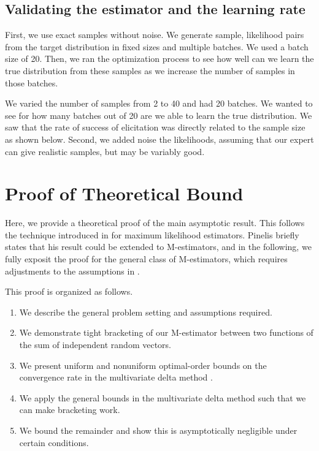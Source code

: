 \subsection{Validating the estimator and the learning rate}

First, we use exact samples without noise. We generate sample, likelihood pairs from the target distribution in fixed sizes and multiple batches. We used a batch size of 20. Then, we ran the optimization process to see how well can we learn the true distribution from these samples as we increase the number of samples in those batches. 

We varied the number of samples from 2 to 40 and had 20 batches. We wanted to see for how many batches out of 20 are we able to learn the true distribution. We saw that the rate of success of elicitation was directly related to the sample size as shown below. Second, we added noise the likelihoods, assuming that our expert can give realistic samples, but may be variably good.

\section*{Proof of Theoretical Bound}
Here, we provide a theoretical proof of the main asymptotic result. This follows the technique introduced in \cite{Pinelis2017} for maximum likelihood estimators. Pinelis briefly states that his result could be extended to M-estimators, and in the following, we fully exposit the proof for the general class of M-estimators, which requires adjustments to the assumptions in \cite{Pinelis2017}.

This proof is organized as follows.

\begin{enumerate}
	\item We describe the general problem setting and assumptions required.
	\item We demonstrate tight bracketing of our M-estimator between two functions of the sum of independent random vectors.
	\item We present uniform and nonuniform optimal-order bounds on the convergence rate in the multivariate delta method \cite{Pinelis2016}.
	\item We apply the general bounds in the multivariate delta method such that we can make bracketing work.
	\item We bound the remainder and show this is asymptotically negligible under certain conditions.
\end{enumerate}

